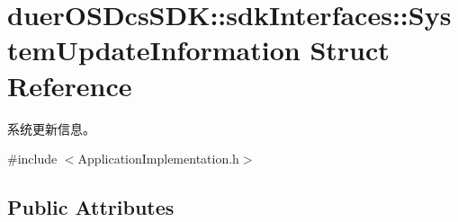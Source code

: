 \hypertarget{structduerOSDcsSDK_1_1sdkInterfaces_1_1SystemUpdateInformation}{}\section{duer\+O\+S\+Dcs\+S\+DK\+:\+:sdk\+Interfaces\+:\+:System\+Update\+Information Struct Reference}
\label{structduerOSDcsSDK_1_1sdkInterfaces_1_1SystemUpdateInformation}


系统更新信息。  




{\ttfamily \#include $<$Application\+Implementation.\+h$>$}

\subsection*{Public Attributes}
